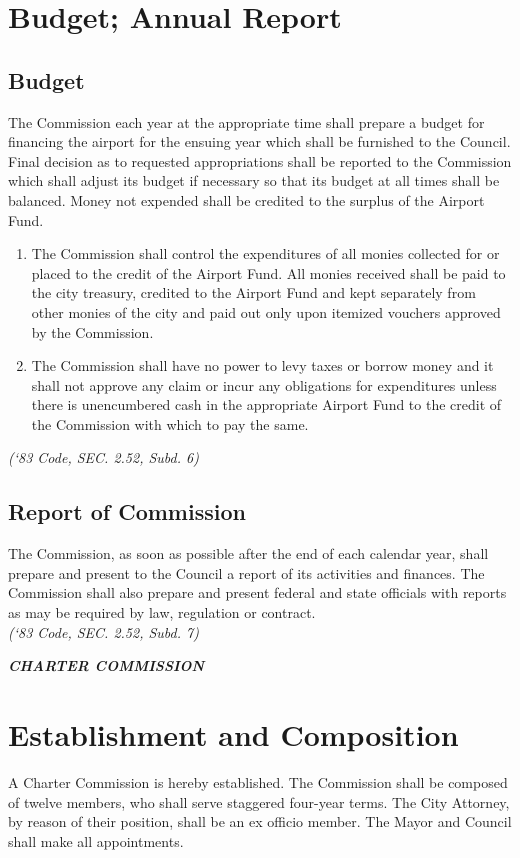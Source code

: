 \section{Budget; Annual Report}
\subsection{Budget}
The Commission each year at the appropriate time shall prepare a budget for financing the airport for the ensuing year which shall be furnished to the Council.  Final decision as to requested appropriations shall be reported to the Commission which shall adjust its budget if necessary so that its budget at all times shall be balanced.  Money not expended shall be credited to the surplus of the Airport Fund.
\begin{enumerate}
    \item The Commission shall control the expenditures of all monies collected for or placed to the credit of the Airport Fund.  All monies received shall be paid to the city treasury, credited to the Airport Fund and kept separately from other monies of the city and paid out only upon itemized vouchers approved by the Commission.
    \item The Commission shall have no power to levy taxes or borrow money and it shall not approve any claim or incur any obligations for expenditures unless there is unencumbered cash in the appropriate Airport Fund to the credit of the Commission with which to pay the same.
\end{enumerate}
\emph{(‘83 Code, SEC. 2.52, Subd. 6)}

\subsection{Report of Commission}
The Commission, as soon as possible after the end of each calendar year, shall prepare and present to the Council a report of its activities and finances.  The Commission shall also prepare and present federal and state officials with reports as may be required by law, regulation or contract.\\ 
\emph{(‘83 Code, SEC. 2.52, Subd. 7)}\\

\centerline{\textbf{\emph{\LARGE{CHARTER COMMISSION}}}}
\setcounter{section}{109}
\section{Establishment and Composition}
A Charter Commission is hereby established. The Commission shall be composed of twelve members, who shall serve staggered four-year terms.  The City Attorney, by reason of their position, shall be an ex officio member. The Mayor and Council shall make all appointments.
